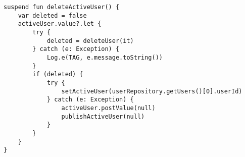 \begin{lstlisting}[caption={User deletion function (Kotlin - UserViewModel)}]
suspend fun deleteActiveUser() {
    var deleted = false
    activeUser.value?.let {
        try {
            deleted = deleteUser(it)
        } catch (e: Exception) {
            Log.e(TAG, e.message.toString())
        }
        if (deleted) {
            try {
                setActiveUser(userRepository.getUsers()[0].userId)
            } catch (e: Exception) {
                activeUser.postValue(null)
                publishActiveUser(null)
            }
        }
    }
}
\end{lstlisting}
